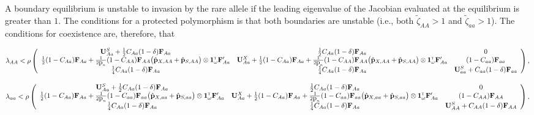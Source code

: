 \documentclass[11pt]{article}
\def\mbf#1{\mathbf{#1}}
\newcommand{\tr}{{\mbox{\tiny \sf T}}}
\begin{document}
\begin{landscape}
A boundary equilibrium is unstable to invasion by the rare allele if the leading eigenvalue of the Jacobian evaluated at the equilibrium is greater than $1$. The conditions for a protected polymorphism is that both boundaries are unstable (i.e., both $\tilde{\zeta}_{AA} > 1$ and $\tilde{\zeta}_{aa} > 1$). The conditions for coexistence are, therefore, that


{\footnotesize
\begin{equation} \label{eq:coexist_AA}
	\lambda_{AA} < 
			\rho\left(\begin{array}{ccc}
\mathbf{U}^S_{Aa} +\frac{1}{2} C_{Aa} (1 - \delta) \mbf{F}_{Aa} & \frac{1}{2} C_{Aa} (1 - \delta) \mbf{F}_{Aa}  & 0 \\
 \frac{1}{2} (1 - C_{Aa}) \mbf{F}_{Aa}+\frac{1}{2  \mbox{p}_{n}} (1 - C_{AA})\mbf{F}_{AA} \big(\hat{\mbf{p}}_{X,AA}+ \hat{\mbf{p}}_{S,AA}  \big) \otimes \mathbf{1}^\tr_{\omega} \mathbf{F}_{Aa}^\prime &\mathbf{U}^X_{Aa} + \frac{1}{2} (1 - C_{Aa}) \mbf{F}_{Aa} +\frac{1}{2  \mbox{p}_{n}} (1 - C_{AA})\mbf{F}_{AA} \big(\hat{\mbf{p}}_{X,AA}+ \hat{\mbf{p}}_{S,AA}  \big) \otimes \mathbf{1}^\tr_{\omega} \mathbf{F}_{Aa}^\prime & (1-C_{aa})\mbf{F}_{aa}\\
  \frac{1}{4} C_{Aa} (1 - \delta) \mbf{F}_{Aa} & \frac{1}{4} C_{Aa} (1 - \delta) \mbf{F}_{Aa}  &\mathbf{U}^S_{aa} +C_{aa} (1 - \delta) \mbf{F}_{aa}  \\ 
			\end{array} \right), \\ 
\end{equation} 


\begin{equation} \label{eq:coexist_AA}
	\lambda_{aa} < 
			\rho\left(\begin{array}{ccc}
\mathbf{U}^S_{Aa} +\frac{1}{2} C_{Aa} (1 - \delta) \mbf{F}_{Aa} & \frac{1}{2} C_{Aa} (1 - \delta) \mbf{F}_{Aa}  & 0 \\
 \frac{1}{2} (1 - C_{Aa}) \mbf{F}_{Aa}+\frac{1}{2  \mbox{p}_{n}} (1 - C_{aa})\mbf{F}_{aa} \big(\hat{\mbf{p}}_{X,aa}+ \hat{\mbf{p}}_{S,aa}  \big) \otimes \mathbf{1}^\tr_{\omega} \mathbf{F}_{Aa}^\prime &\mathbf{U}^X_{Aa} + \frac{1}{2} (1 - C_{Aa}) \mbf{F}_{Aa} +\frac{1}{2  \mbox{p}_{n}} (1 - C_{aa})\mbf{F}_{aa} \big(\hat{\mbf{p}}_{X,aa}+ \hat{\mbf{p}}_{S,aa}  \big) \otimes \mathbf{1}^\tr_{\omega} \mathbf{F}_{Aa}^\prime & (1-C_{AA})\mbf{F}_{AA}\\
  \frac{1}{4} C_{Aa} (1 - \delta) \mbf{F}_{Aa} & \frac{1}{4} C_{Aa} (1 - \delta) \mbf{F}_{Aa}  &\mathbf{U}^S_{AA} +C_{AA} (1 - \delta) \mbf{F}_{AA}  \\ 
			\end{array} \right), \\ 
\end{equation} 
}


\end{landscape}
\end{document}
